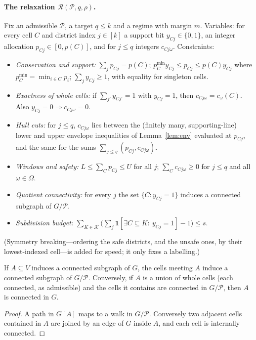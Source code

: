 \paragraph{The relaxation $\mathcal R(\mathcal P,q,\rho)$.}
Fix an admissible $\mathcal P$, a target $q\le k$ and a regime with margin $m$. Variables: for every cell $C$ and district index $j\in[k]$ a support bit $y_{Cj}\in\{0,1\}$, an integer allocation $p_{Cj}\in[0,p(C)]$, and for $j\le q$ integers $c_{Cj\omega}$. Constraints:
\begin{itemize}
\item[(R1)] \emph{Conservation and support:} $\sum_jp_{Cj}=p(C)$; $p^{\min}_Cy_{Cj}\le p_{Cj}\le p(C)y_{Cj}$ where $p^{\min}_C=\min_{i\in C}p_i$; $\sum_jy_{Cj}\ge1$, with equality for singleton cells.
\item[(R2)] \emph{Exactness of whole cells:} if $\sum_{j'}y_{Cj'}=1$ with $y_{Cj}=1$, then $c_{Cj\omega}=c_\omega(C)$. Also $y_{Cj}=0\Rightarrow c_{Cj\omega}=0$.
\item[(R3)] \emph{Hull cuts:} for $j\le q$, $c_{Cj\omega}$ lies between the (finitely many, supporting-line) lower and upper envelope inequalities of Lemma~\ref{lem:env} evaluated at $p_{Cj}$, and the same for the sums $\sum_{j\le q}(p_{Cj},c_{Cj\omega})$.
\item[(R4)] \emph{Windows and safety:} $L\le\sum_Cp_{Cj}\le U$ for all $j$; $\sum_Cc_{Cj\omega}\ge0$ for $j\le q$ and all $\omega\in\Omega$.
\item[(R5)] \emph{Quotient connectivity:} for every $j$ the set $\{C:y_{Cj}=1\}$ induces a connected subgraph of $G/\mathcal P$.
\item[(R6)] \emph{Subdivision budget:} $\sum_{K\in\mathcal K}\bigl(\sum_j\mathbf 1[\exists C\subseteq K:\ y_{Cj}=1]-1\bigr)\le s$.
\end{itemize}
(Symmetry breaking---ordering the safe districts, and the unsafe ones, by their lowest-indexed cell---is added for speed; it only fixes a labelling.)

\begin{lemma}\label{lem:quot}
If $A\subseteq V$ induces a connected subgraph of $G$, the cells meeting $A$ induce a connected subgraph of $G/\mathcal P$. Conversely, if $A$ is a union of whole cells (each connected, as admissible) and the cells it contains are connected in $G/\mathcal P$, then $A$ is connected in $G$.
\end{lemma}
\begin{proof}
A path in $G[A]$ maps to a walk in $G/\mathcal P$. Conversely two adjacent cells contained in $A$ are joined by an edge of $G$ inside $A$, and each cell is internally connected.
\end{proof}

